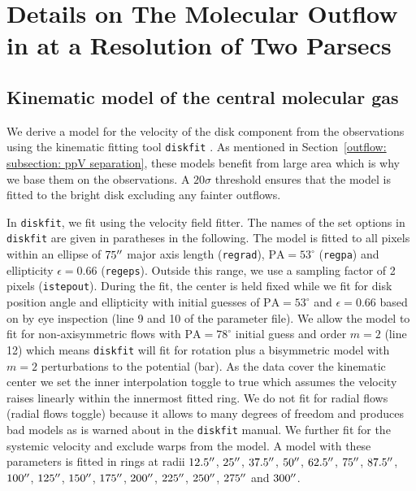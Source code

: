 
\chapter{Details on The Molecular Outflow in  at a Resolution of Two Parsecs}
\label{appendix: outflow}



\section{Kinematic model of the central molecular gas}
\label{appendix: outflow: model}

We derive a model for the velocity of the disk component from the  observations using the kinematic fitting tool \texttt{diskfit} \citep{2007ApJ...664..204S,2010MNRAS.404.1733S,2015arXiv150907120S}. As mentioned in Section~\ref{outflow: subsection: ppV separation}, these models benefit from large area which is why we base them on the  observations. A $20\sigma$ threshold ensures that the model is fitted to the bright disk excluding any fainter outflows.

In \texttt{diskfit}, we fit using the velocity field fitter. The names of the set options in \texttt{diskfit} are given in paratheses in the following. The model is fitted to all pixels within an ellipse of $75^{\prime\prime}$ major axis length (\texttt{regrad}), $\mathrm{PA} = 53^\circ$ (\texttt{regpa}) and ellipticity $\epsilon = 0.66$ (\texttt{regeps}). Outside this range, we use a sampling factor of 2 pixels (\texttt{istepout}). During the fit, the center is held fixed while we fit for disk position angle and ellipticity with initial guesses of $\mathrm{PA} = 53^\circ$ and $\epsilon = 0.66$ based on by eye inspection (line 9 and 10 of the parameter file). We allow the model to fit for non-axisymmetric flows with $\mathrm{PA} = 78^\circ$ initial guess and order $m=2$ (line 12) which means \texttt{diskfit} will fit for rotation plus a bisymmetric model with $m=2$ perturbations to the potential (bar). As the  data cover the kinematic center we set the inner interpolation toggle to true which assumes the velocity raises linearly within the innermost fitted ring. We do not fit for radial flows (radial flows toggle) because it allows to many degrees of freedom and produces bad models as is warned about in the \texttt{diskfit} manual. We further fit for the systemic velocity and exclude warps from the model. A model with these parameters is fitted in rings at radii $12.5^{\prime\prime}$, $25^{\prime\prime}$, $37.5^{\prime\prime}$, $50^{\prime\prime}$, $62.5^{\prime\prime}$, $75^{\prime\prime}$, $87.5^{\prime\prime}$, $100^{\prime\prime}$, $125^{\prime\prime}$, $150^{\prime\prime}$, $175^{\prime\prime}$, $200^{\prime\prime}$, $225^{\prime\prime}$, $250^{\prime\prime}$, $275^{\prime\prime}$ and $300^{\prime\prime}$.

